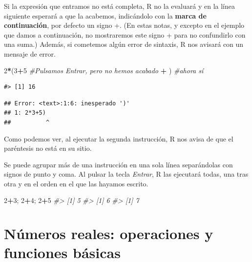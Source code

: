 \documentclass[
]{book}
\newenvironment{Shaded}{\begin{snugshade}}{\end{snugshade}}
\newcommand{\CommentTok}[1]{\textcolor[rgb]{0.56,0.35,0.01}{\textit{#1}}}
\newcommand{\DecValTok}[1]{\textcolor[rgb]{0.00,0.00,0.81}{#1}}
\newcommand{\NormalTok}[1]{#1}
\newcommand{\OperatorTok}[1]{\textcolor[rgb]{0.81,0.36,0.00}{\textbf{#1}}}
\newcommand{\StringTok}[1]{\textcolor[rgb]{0.31,0.60,0.02}{#1}}
\theoremstyle{definition}
\theoremstyle{definition}
\theoremstyle{definition}
\theoremstyle{remark}
\begin{document}
Si la expresión que entramos no está completa, R no la evaluará y en la línea siguiente esperará a que la acabemos, indicándolo con la \textbf{marca de continuación}, por defecto un signo +. (En estas notas, y excepto en el ejemplo que damos a continuación, no mostraremos este signo + para no confundirlo con una suma.) Además, si cometemos algún error de sintaxis, R nos avisará con un mensaje de error.

\begin{Shaded}
\begin{Highlighting}[]
\DecValTok{2}\OperatorTok{*}\NormalTok{(}\DecValTok{3}\OperatorTok{+}\DecValTok{5} \CommentTok{\#Pulsamos Entrar, pero no hemos acabado}
\OperatorTok{+}\StringTok{ }\NormalTok{) }\CommentTok{\#ahora sí}
\end{Highlighting}
\end{Shaded}

\begin{verbatim}
#> [1] 16
\end{verbatim}

\begin{verbatim}
## Error: <text>:1:6: inesperado ')'
## 1: 2*3+5)
##          ^
\end{verbatim}

Como podemos ver, al ejecutar la segunda instrucción, R nos avisa de que el paréntesis no está en su sitio.

Se puede agrupar más de una instrucción en una sola línea separándolas con signos de punto y coma. Al pulsar la tecla \emph{Entrar}, R las ejecutará todas, una tras otra y en el orden en el que las hayamos escrito.

\begin{Shaded}
\begin{Highlighting}[]
\DecValTok{2}\OperatorTok{+}\DecValTok{3}\NormalTok{; }\DecValTok{2}\OperatorTok{+}\DecValTok{4}\NormalTok{; }\DecValTok{2}\OperatorTok{+}\DecValTok{5}
\CommentTok{\#\textgreater{} [1] 5}
\CommentTok{\#\textgreater{} [1] 6}
\CommentTok{\#\textgreater{} [1] 7}
\end{Highlighting}
\end{Shaded}

\hypertarget{nuxfameros-reales-operaciones-y-funciones-buxe1sicas}{%
\section{Números reales: operaciones y funciones básicas}\label{nuxfameros-reales-operaciones-y-funciones-buxe1sicas}}
\end{document}
